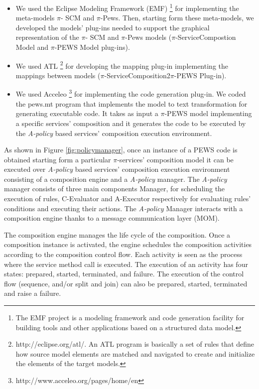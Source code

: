 \begin{itemize}
\item 	We  used the Eclipse Modeling Framework (EMF) \footnote {The EMF project is a modeling framework and code generation facility for building tools and other applications based on a structured data model.}   for implementing the meta-models  $\pi$- SCM and $\pi$-{\sc Pews}. Then, starting form these meta-models, we  developed the models' plug-ins needed to support the graphical representation of the $\pi$- SCM and $\pi$-{\sc Pews} models ($\pi$-ServiceCompostion Model and $\pi$-PEWS Model plug-ins).

\item	 We used  ATL \footnote{http://eclipse.org/atl/. An ATL program is basically a set of rules that define how source model elements are matched and navigated to create and initialize the elements of the target models.}
for  developing the mapping plug-in implementing the  mappings between models ($\pi$-ServiceComposition2$\pi$-PEWS Plug-in).

\item 	We  used Acceleo \footnote{http://www.acceleo.org/pages/home/en} for implementing  the code generation plug-in. We coded the pews.mt program  that implements the model to text transformation for generating executable code. It takes as input a $\pi$-PEWS model implementing a specific services' composition and it generates the code to be executed by the 
{\em A-policy} based services' composition execution environment. 

\end{itemize}

%
As  shown in Figure \ref{fig:policymanager}, once an instance of a PEWS code is obtained starting form a particular $\pi$-services' composition model it can be executed over {\em A-policy} based services' composition execution environment  consisting of a composition engine and a {\em A-policy} manager.  The  {\em A-policy} manager  consists of three main components Manager, for scheduling the execution of rules, C-Evaluator and A-Executor respectively for evaluating rules' conditions and executing their actions. The {\em A-policy} Manager interacts with a composition engine thanks to a  message communication layer (MOM).


The composition engine manages the life cycle of the composition. Once a composition instance is activated, the engine schedules the composition activities according to the composition control flow.
Each activity is seen as the process where the service method call is executed.
The execution of an activity has four states: prepared, started, terminated, and failure.
The execution of the control flow (sequence, and/or split and join) can also be prepared, started, terminated and raise a failure.


